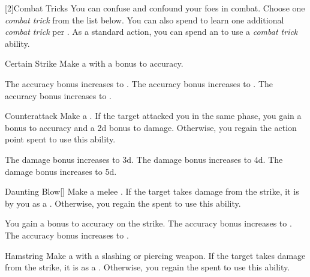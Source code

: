         [2]{Combat Tricks}
        You can confuse and confound your foes in combat.
        Choose one \textit{combat trick} from the list below.
        You can also spend  to learn one additional \textit{combat trick} per .
        As a standard action, you can spend an  to use a \textit{combat trick} ability.
        {
            \begin{apability}{Certain Strike}
                Make a  with a  bonus to accuracy.

                \rankline
                 The accuracy bonus increases to .
                 The accuracy bonus increases to .
                 The accuracy bonus increases to .
            \end{apability}

            \begin{apability}{Counterattack}
                Make a .
                If the target attacked you in the same phase, you gain a  bonus to accuracy and a \plus2d bonus to damage.
                Otherwise, you regain the action point spent to use this ability.

                \rankline
                 The damage bonus increases to \plus3d.
                 The damage bonus increases to \plus4d.
                 The damage bonus increases to \plus5d.
            \end{apability}

            \begin{apability}{Daunting Blow}[]
                Make a melee .
                If the target takes damage from the strike, it is  by you as a .
                Otherwise, you regain the  spent to use this ability.

                \rankline
                 You gain a  bonus to accuracy on the strike.
                 The accuracy bonus increases to .
                 The accuracy bonus increases to .
            \end{apability}

            \begin{apability}{Hamstring}
                Make a  with a slashing or piercing weapon.
                If the target takes damage from the strike, it is  as a .
                Otherwise, you regain the  spent to use this ability.


\end{apability}}
